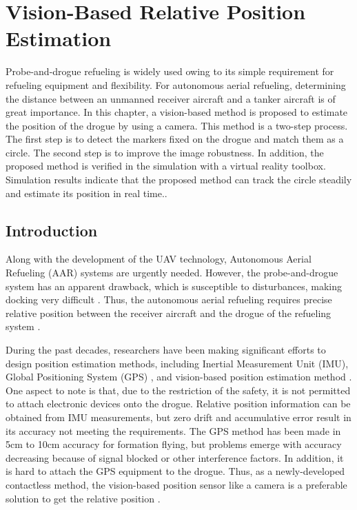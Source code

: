 
\chapter{Vision-Based Relative Position Estimation}

Probe-and-drogue refueling is widely used owing to its simple requirement for
refueling equipment and flexibility. For autonomous aerial refueling,
determining the distance between an unmanned receiver aircraft and a
tanker aircraft is of great importance. 
In this chapter, a vision-based method
is proposed to estimate the position of the drogue by using a camera. This
method is a two-step process. The first step is to detect the markers fixed on
the drogue and match them as a circle. The second step is to improve the image robustness. In
addition, the proposed method is verified in the simulation with a virtual
reality toolbox. Simulation results indicate that the proposed method can
track the circle steadily and estimate its position in real time..

\section{Introduction}

Along with the
development of the UAV technology, Autonomous Aerial Refueling (AAR) systems are
urgently needed.
However, the probe-and-drogue system has an apparent drawback, which is
susceptible to disturbances, making docking very difficult \cite{Dong}.
Thus, the autonomous aerial refueling requires precise
relative position between the receiver aircraft and the drogue of the
refueling system \cite{Liu}. 

During the past decades, researchers have been
making significant efforts to design position estimation methods, including Inertial Measurement Unit (IMU), Global Positioning
System (GPS) \cite{Han}, and vision-based position estimation method \cite{Zhao}. One aspect to note is that, due to
the restriction of the safety, it is not permitted to attach electronic
devices onto the drogue. 
Relative position information can be obtained from IMU measurements, but
zero drift and accumulative error result in its accuracy not meeting the
requirements. The GPS method has been made in 5cm to 10cm accuracy for
formation flying, but problems emerge with accuracy decreasing because of
signal blocked or other interference factors. In addition, it is hard to
attach the GPS equipment to the drogue. Thus, as a
newly-developed contactless method, the vision-based position sensor like a
camera is a preferable solution to get the relative position \cite{Fu}.

